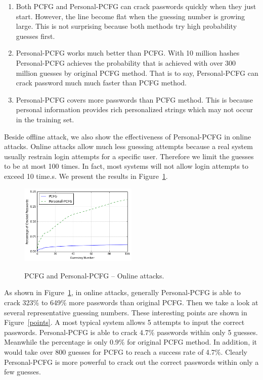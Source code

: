 \begin{enumerate}[leftmargin=*]
\item Both PCFG and Personal-PCFG can crack passwords quickly when they just start. However, the line become flat when the guessing number is growing large. This is not surprising because both methods try high probability guesses first. 

\item Personal-PCFG works much better than PCFG. With 10 million hashes Personal-PCFG achieves the probability that is achieved with over 300 million guesses by original PCFG method. That is to say, Personal-PCFG can crack password much much faster than PCFG method. 

\item Personal-PCFG covers more passwords than PCFG method. This is because personal information provides rich personalized strings which may not occur in the training set.

\end{enumerate}

Beside offline attack, we also show the effectiveness of Personal-PCFG in online attacks. Online attacks allow much less guessing attempts because a real system usually restrain login attempts for a specific user. Therefore we limit the guesses to be at most 100 times. In fact, most systems will not allow login attempts to exceed 10 time.s. We present the results in Figure~\ref{cmp100}.

\begin{figure}[h!]
\centering
  \caption{PCFG and Personal-PCFG -- Online attacks.}{}
  \label{cmp100}
  \centering
    \includegraphics[width=0.5\textwidth]{fig/cmp100}
\end{figure}

As shown in Figure~\ref{cmp100}, in online attacks, generally Personal-PCFG is able to crack 323\% to 649\% more passwords than original PCFG. Then we take a look at several representative guessing numbers. These interesting points are shown in Figure~\ref{points}. A most typical system allows 5 attempts to input the correct passwords. Personal-PCFG is able to crack 4.7\% passwords within only 5 guesses. Meanwhile the percentage is only 0.9\% for original PCFG method. In addition, it would take over 800 guesses for PCFG to reach a success rate of 4.7\%. Clearly Personal-PCFG is more powerful to crack out the correct passwords within only a few guesses.

